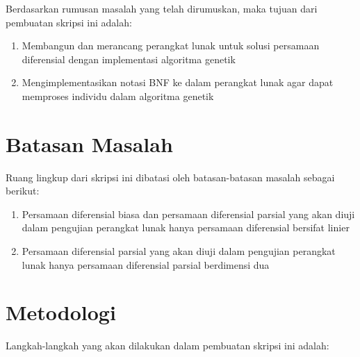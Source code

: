 Berdasarkan rumusan masalah yang telah dirumuskan, maka tujuan dari pembuatan skripsi ini adalah:

\begin{enumerate}
	\item Membangun dan merancang perangkat lunak untuk solusi persamaan diferensial dengan implementasi algoritma genetik
	\item Mengimplementasikan notasi BNF ke dalam perangkat lunak agar dapat memproses individu dalam algoritma genetik
\end{enumerate}

\section{Batasan Masalah}
\label{sec:batasan}

Ruang lingkup dari skripsi ini dibatasi oleh batasan-batasan masalah sebagai berikut:

\begin{enumerate}
 	\item Persamaan diferensial biasa dan persamaan diferensial parsial yang akan diuji dalam pengujian perangkat lunak hanya persamaan diferensial bersifat linier
	\item Persamaan diferensial parsial yang akan diuji dalam pengujian perangkat lunak hanya persamaan diferensial parsial berdimensi dua
\end{enumerate}


\section{Metodologi}
\label{sec:metlit}

Langkah-langkah yang akan dilakukan dalam pembuatan skripsi ini adalah:

